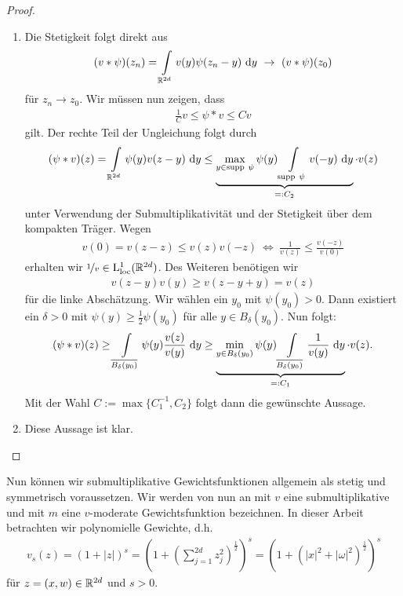 \begin{proof}
	\begin{enumerate}[label =\textbf{(\roman*)}]
		\item 
		Die Stetigkeit folgt direkt aus
		\begin{align*}
		(v \ast \psi)(z_n) 
		= \int \limits_{\mathbb{R}^{2d}} v(y) \psi(z_n-y) \text{ d} y
		\ \rightarrow \
		(v \ast \psi)(z_0)
		\end{align*}
		für $ z_n \to z_0 $.
		Wir müssen nun zeigen, dass
		\begin{align*}
		\frac{1}{C} v  \leq  \psi \ast v \leq C v  
		\end{align*}
		gilt.
		Der rechte Teil der Ungleichung folgt durch
		\begin{align*}
		(\psi \ast v)(z) = 
		\int \limits_{\mathbb{R}^{2d}} \psi(y) v(z - y) \text{ d} y
		\leq
		\underbrace{\max \limits_{y \in \mathrm{supp}  \ \psi}  \psi(y)
			\int \limits_{ \mathrm{supp}  \ \psi} v(-y) \text{ d} y
			}_{=: C_2} \cdot v(z)
		\end{align*}
		unter Verwendung der Submultiplikativität und der Stetigkeit über dem kompakten Träger.
		Wegen 
		\begin{align*}
		v( 0 ) = v(z- z) \leq v(z) v(-z)
		\ \Leftrightarrow \
		\frac{1}{v(z)} \leq \frac{v(-z)}{v(0)}
		\end{align*}
		erhalten wir $ \nicefrac{1}{v} \in \mathrm{L}^1_\mathrm{loc}(\mathbb{R}^{2d}) $.
		Des Weiteren benötigen wir 
		\begin{align*}
			v(z-y) v(y) \geq v(z-y+y) = v(z)
		\end{align*}
		für die linke Abschätzung. 
		Wir wählen ein $ y_0  $ mit $ \psi(y_0 ) > 0 $.
		Dann existiert ein $ \delta > 0  $ mit $ \psi(y) \geq \frac{1}{2} \psi(y_0) $
 		für alle $ y \in B_\delta(y_0) $.
		Nun folgt:
		\begin{align*}
		(\psi \ast v)(z) 
		\geq 
		\int \limits_{\overline{B_\delta(y_0)}} \psi(y) \frac{v(z)}{v(y)} \text{ d} y
		\geq 
		\underbrace{\min \limits_{y \in B_\delta(y_0)} \psi(y) 
		\int \limits_{\overline{B_\delta(y_0)}} \frac{1}{v(y)} \text{ d} y}_{=: C_1}
		 \cdot v(z).
		\end{align*}
		Mit der Wahl $ C := \max \lbrace C_1^{-1}, C_2 \rbrace $ folgt dann die gewünschte Aussage.
		\item Diese Aussage ist klar.
		
	\end{enumerate}
\end{proof}
Nun können wir submultiplikative Gewichtsfunktionen allgemein als stetig und symmetrisch voraussetzen. Wir werden von nun an mit $ v $ eine submultiplikative und mit $ m $ eine $ v $-moderate Gewichtsfunktion bezeichnen.
In dieser Arbeit betrachten wir polynomielle Gewichte, d.h.
\begin{align}\label{eq:poly_weight}
v_s(z) = (1+|z|)^s
=
\left( 1 + \left( \sum \limits_{j=1}^{2d} z_j^2 \right)^{\frac{1}{2}} \right)^s
= (1 +  (|x|^2 + |\omega|^2)^\frac{1}{2})^s
\end{align}
für $ z= (x,w) \in \mathbb{R}^{2d} $ und $ s > 0 $.

